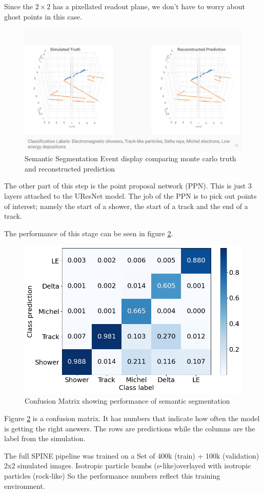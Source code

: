 Since the $2 \times 2$ has a pixellated readout plane, we don't have to worry about ghost points in this case.

\begin{figure}[H]
  \centering
  \includegraphics[width=120mm]{figures/semanticEvent.png}
  \caption{Semantic Segmentation Event display comparing monte carlo truth and reconstructed prediction}
  \label{semanticEvent}
\end{figure}

The other part of this step is the point proposal network (PPN).
This is just 3 layers attached to the UResNet model.
The job of the PPN is to pick out points of interest; namely the start of a shower, the start of a track and the end of a track.

The performance of this stage can be seen in figure \ref{semanticPerformance}.

\begin{figure}[H]
  \centering
  \includegraphics[width=120mm]{figures/semanticPerformance.png}
  \caption{Confusion Matrix showing performance of semantic segmentation}
  \label{semanticPerformance}
\end{figure}

Figure \ref{semanticPerformance}  is a confusion matrix. It has numbers that indicate how often the model is getting the right answers. The rows are predictions while the columns are the label from the simulation.

The full SPINE pipeline was trained on a Set of 400k (train) + 100k (validation) 2x2 simulated images.
Isotropic particle bombs ($\nu$-like)overlayed with isotropic particles (rock-like)
So the performance numbers reflect this training environment.






